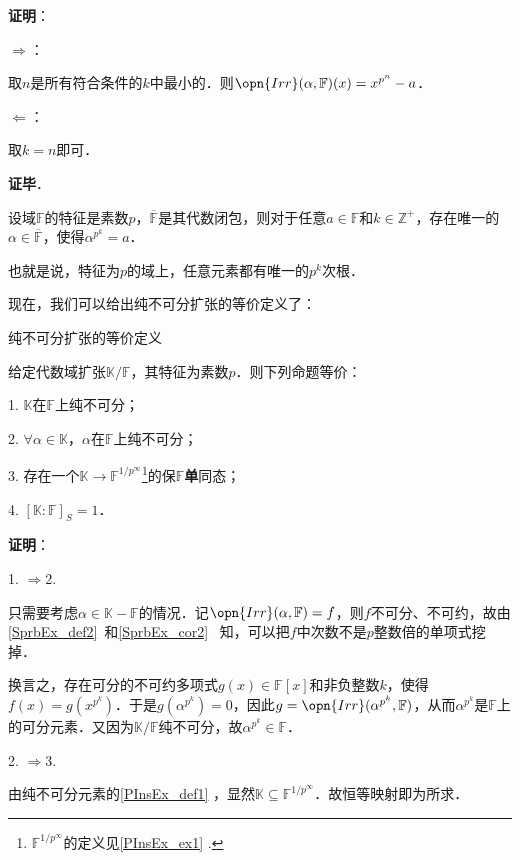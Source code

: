 \textbf{证明}：

$\Rightarrow$：

取$n$是所有符合条件的$k$中最小的．则$\opn{Irr}(\alpha, \mathbb{F})(x) = x^{p^n}-a$．

$\Leftarrow$：

取$k=n$即可．

\textbf{证毕}．

\begin{corollary}{}\label{PInsEx_cor1}
设域$\mathbb{F}$的特征是素数$p$，$\overline{\mathbb{F}}$是其代数闭包，则对于任意$a\in\mathbb{F}$和$k\in\mathbb{Z}^+$，存在唯一的$\alpha\in\overline{\mathbb{F}}$，使得$\alpha^{p^k}=a$．
\end{corollary}

也就是说，特征为$p$的域上，任意元素都有唯一的$p^k$次根．


现在，我们可以给出纯不可分扩张的等价定义了：




\begin{theorem}{纯不可分扩张的等价定义}\label{PInsEx_the1}


给定代数域扩张$\mathbb{K}/\mathbb{F}$，其特征为素数$p$．则下列命题等价：

1. $\mathbb{K}$在$\mathbb{F}$上纯不可分；

2. $\forall \alpha\in\mathbb{K}$，$\alpha$在$\mathbb{F}$上纯不可分；

3. 存在一个$\mathbb{K}\to\mathbb{F}^{1/p^\infty}$\footnote{$\mathbb{F}^{1/p^\infty}$的定义见\autoref{PInsEx_ex1} .}的保$\mathbb{F}$\textbf{单}同态；

4. $[\mathbb{K}:\mathbb{F}]_S=1$．


\end{theorem}

\textbf{证明}：

1. $\Rightarrow$2. 

只需要考虑$\alpha\in\mathbb{K}-\mathbb{F}$的情况．记$\opn{Irr}(\alpha, \mathbb{F})=f$，则$f$不可分、不可约，故由\autoref{SprbEx_def2}~和\autoref{SprbEx_cor2}~ 知，可以把$f$中次数不是$p$整数倍的单项式挖掉．

换言之，存在可分的不可约多项式$g(x)\in\mathbb{F}[x]$和非负整数$k$，使得$f(x)=g(x^{p^k})$．于是$g(\alpha^{p^k})=0$，因此$g=\opn{Irr}(\alpha^{p^k}, \mathbb{F})$，从而$\alpha^{p^k}$是$\mathbb{F}$上的可分元素．又因为$\mathbb{K}/\mathbb{F}$纯不可分，故$\alpha^{p^k}\in\mathbb{F}$．


2. $\Rightarrow$3. 

由纯不可分元素的\autoref{PInsEx_def1} ，显然$\mathbb{K}\subseteq\mathbb{F}^{1/p^\infty}$．故恒等映射即为所求．

